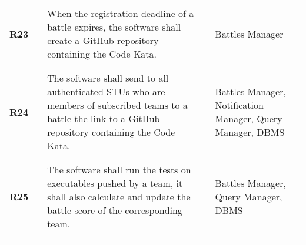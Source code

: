 \begin{longtable}[H]{l l p{6cm} l p{4cm}}
    \textbf{R23}            & \vline & When the registration deadline of a battle expires, the software shall create a GitHub repository containing the Code Kata.                                                                                                                                                  & \vline &  Battles Manager                                                                         \\          
                            &        &                                                                                                                                                                                                                                                                              &        &                                                                                          \\\hline & & \\ 
    \textbf{R24}            & \vline & The software shall send to all authenticated STUs who are members of subscribed teams to a battle the link to a GitHub repository containing the Code Kata.                                                                                                                  & \vline &  Battles Manager, Notification Manager, Query Manager, DBMS                              \\          
                            &        &                                                                                                                                                                                                                                                                              &        &                                                                                          \\\hline & & \\ 
    \textbf{R25}            & \vline & The software shall run the tests on executables pushed by a team, it shall also calculate and update the battle score of the corresponding team.                                                                                                                             & \vline &  Battles Manager, Query Manager, DBMS                                                    \\          
                            &        &                                                                                                                                                                                                                                                                              &        &                                                                                          \\\hline & & \\ 

\end{longtable}
